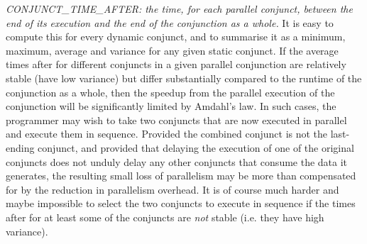 


\emph{CONJUNCT\_TIME\_AFTER:
the time, for each parallel conjunct,
between the end of its execution and the end of the conjunction as a whole.}
It is easy to compute this for every dynamic conjunct,
and to summarise it as a minimum, maximum, average and variance
for any given static conjunct.
If the average times after
for different conjuncts in a given parallel conjunction
are relatively stable (have low variance)
but differ substantially compared to the runtime of the conjunction as a whole,
then the speedup from the parallel execution of the conjunction
will be significantly limited by Amdahl's law.
In such cases, the programmer may wish to take
two conjuncts that are now executed in parallel
and execute them in sequence.
Provided the combined conjunct is not the last-ending conjunct,
and provided that delaying the execution of one of the original conjuncts
does not unduly delay any other conjuncts that consume the data it generates,
the resulting small loss of parallelism
may be more than compensated for
by the reduction in parallelism overhead.
It is of course much harder and maybe impossible
to select the two conjuncts to execute in sequence
if the times after for at least some of the conjuncts
are \emph{not} stable (i.e. they have high variance).


